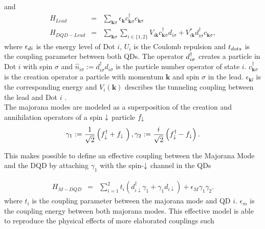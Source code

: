 \documentclass[showpacs,aps,prb,reprint,superscriptaddress]{revtex4-1}
\begin{document}
and 
\begin{eqnarray}
H_{Lead} & = & \sum_{\mathbf{k}\sigma }\epsilon_{\mathbf{k}}c_{\mathbf{k}\sigma }^{\dagger}c_{\mathbf{k}\sigma } \label{eq:H_L}\\ 
H_{DQD-Lead} & = &  \sum_{\mathbf{k}\sigma }\sum_{i\in\{1,2\}}V_{i\textbf{k}} c_{\mathbf{k}\sigma }^{\dagger}d_{i\sigma}+V^*_{i\textbf{k}} d_{i\sigma}^{\dagger}c_{\mathbf{k}\sigma }  \label{eq:H_DQDL},
\end{eqnarray}
%
where $\epsilon_{di}$ is the energy level of Dot $i$, $U_i$ is the Coulomb repulsion and $t_{dots}$ is the coupling parameter between both QDs. The operator $d^{\dagger}_{i\sigma}$ creates a particle in Dot $i$ with spin $\sigma$ and $\hat{n}_{i\sigma}:=d_{i\sigma}^{\dagger}d_{i\sigma}$ is the particle number operator of state $i$.  $c_{\mathbf{k}\sigma }^{\dagger}$ is the creation operator a particle with momentum $\mathbf{k}$ and spin
$\sigma$ in the lead.  $\epsilon_{\mathbf{k}l}$ is the corresponding energy
 and $V_i(\textbf{k})$ describes the tunneling coupling between the lead and Dot $i$ . \\


The majorana modes are modeled as a superposition of the creation and annihilation operators of a spin $\downarrow$ particle $f_\downarrow$
\begin{equation}
    \gamma_1 := \frac{1}{\sqrt{2}} \left( f^\dagger_{\downarrow} + f_{\downarrow}\ \right) , \gamma_2 := \frac{i}{\sqrt{2}} \left( f^\dagger_{\downarrow} - f_{\downarrow} \right). \label{eq:MajOp}
\end{equation}


This makes possible to define an effective coupling between the Majorana Mode and the DQD by attaching $\gamma_1$ with the spin-$\downarrow$ channel in the QDs

\begin{eqnarray}
H_{M-DQD} & = &  \sum_{i=1}^2t_{i} \left(d_{i\downarrow}^{\dagger}\gamma_{1}+\gamma_{1}d_{i\downarrow}\right) + \epsilon_M \gamma_1\gamma_2. 
\label{eq:H_MDQD}
\end{eqnarray}
where $t_i$ is the coupling parameter between the majorana mode and QD $i$. $\epsilon_m$ is the coupling energy between both majorana modes. This effective model is able to reproduce the physical effects of more elaborated couplings \cite{ruiz-tijerina_interaction_2015} such 
\end{document}
